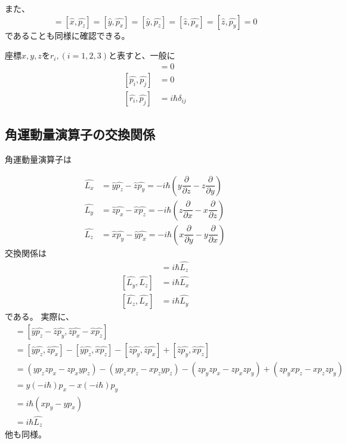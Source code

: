また、
\begin{equation}
	[\hat{x},\hat{p_y}] = [\hat{x},\hat{p_z}] =
	[\hat{y},\hat{p_x}] = [\hat{y},\hat{p_z}] =
	[\hat{z},\hat{p_x}] = [\hat{z},\hat{p_y}] = 0
\end{equation}
であることも同様に確認できる。

座標$x,y,z$を$r_i,(i = 1,2,3)$と表すと、一般に
\begin{align}
	[\hat{r_i},\hat{r_j}] &= 0 \\
	[\hat{p_i},\hat{p_j}] &= 0 \\
	[\hat{r_i},\hat{p_j}] &= i\hbar\delta_{ij}
\end{align}

\subsection{角運動量演算子の交換関係}
角運動量演算子は

\begin{align}
	\hat{L_x} &= \hat{y}\hat{p_z} - \hat{z}\hat{p_y} = -i\hbar\left( y\dfrac{\partial}{\partial z} - z\dfrac{\partial}{\partial y}\right) \\
	\hat{L_y} &= \hat{z}\hat{p_x} - \hat{x}\hat{p_z} = -i\hbar\left( z\dfrac{\partial}{\partial x} - x\dfrac{\partial}{\partial z}\right) \\
	\hat{L_z} &= \hat{x}\hat{p_y} - \hat{y}\hat{p_x} = -i\hbar\left( x\dfrac{\partial}{\partial y} - y\dfrac{\partial}{\partial x}\right)
\end{align}
交換関係は
\begin{align}
	[\hat{L_x},\hat{L_y}] &= i\hbar\hat{L_z} \\
	[\hat{L_y},\hat{L_z}] &= i\hbar\hat{L_x} \\
	[\hat{L_z},\hat{L_x}] &= i\hbar\hat{L_y}
\end{align}
である。
実際に、
\begin{align}
	[\hat{L_x},\hat{L_y}]
	&= [\hat{y}\hat{p_z} - \hat{z}\hat{p_y}, \hat{z}\hat{p_x} - \hat{x}\hat{p_z}] \\
	&= [\hat{y}\hat{p_z},\hat{z}\hat{p_x}] - [\hat{y}\hat{p_z},\hat{x}\hat{p_z}] - [\hat{z}\hat{p_y},\hat{z}\hat{p_x}] + [\hat{z}\hat{p_y},\hat{x}\hat{p_z}] \\
	&= (yp_z zp_x - zp_x yp_z) - (yp_z xp_z - xp_z yp_z) - (zp_y zp_x - zp_x zp_y) + (zp_y xp_z - xp_z zp_y) \\
	&= y(-i\hbar)p_x - x(-i\hbar)p_y \\
	&= i\hbar(xp_y - yp_x) \\
	&= i\hbar\hat{L_z}
\end{align}
他も同様。

